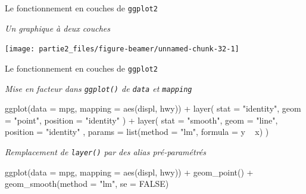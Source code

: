 \documentclass[12pt,ignorenonframetext,]{beamer}
\newenvironment{Shaded}{}{}
\newcommand{\KeywordTok}[1]{\textcolor[rgb]{0.00,0.00,1.00}{#1}}
\newcommand{\DataTypeTok}[1]{#1}
\newcommand{\StringTok}[1]{\textcolor[rgb]{0.00,0.50,0.50}{#1}}
\newcommand{\OtherTok}[1]{\textcolor[rgb]{1.00,0.25,0.00}{#1}}
\newcommand{\OperatorTok}[1]{#1}
\newcommand{\NormalTok}[1]{#1}
\renewenvironment{Shaded}{\begin{snugshade}}{\end{snugshade}}
\begin{document}
\begin{frame}{\large Le fonctionnement en \og couches \fg{} de
\texttt{ggplot2}}

\emph{Un graphique à deux couches}

\centering

\texttt{[image: partie2\_files/figure-beamer/unnamed-chunk-32-1]}

\end{frame}

\begin{frame}[fragile]{\large Le fonctionnement en \og couches \fg{} de
\texttt{ggplot2}}

\emph{Mise en facteur dans \texttt{ggplot()} de \texttt{data} et
\texttt{mapping}}

\footnotesize \vspace{-1mm}

\begin{Shaded}
\begin{Highlighting}[]
\KeywordTok{ggplot}\NormalTok{(}\DataTypeTok{data =}\NormalTok{ mpg, }\DataTypeTok{mapping =} \KeywordTok{aes}\NormalTok{(displ, hwy)) }\OperatorTok{+}\StringTok{ }\KeywordTok{layer}\NormalTok{(}
  \DataTypeTok{stat =} \StringTok{"identity"}\NormalTok{, }\DataTypeTok{geom =} \StringTok{"point"}\NormalTok{, }\DataTypeTok{position =} \StringTok{"identity"}
\NormalTok{) }\OperatorTok{+}\StringTok{ }\KeywordTok{layer}\NormalTok{(}
  \DataTypeTok{stat =} \StringTok{"smooth"}\NormalTok{, }\DataTypeTok{geom =} \StringTok{"line"}\NormalTok{, }\DataTypeTok{position =} \StringTok{"identity"}
\NormalTok{  , }\DataTypeTok{params =} \KeywordTok{list}\NormalTok{(}\DataTypeTok{method =} \StringTok{"lm"}\NormalTok{, }\DataTypeTok{formula =}\NormalTok{ y }\OperatorTok{~}\StringTok{ }\NormalTok{x)}
\NormalTok{)}
\end{Highlighting}
\end{Shaded}

\normalsize \vspace{-3mm}

\emph{Remplacement de \texttt{layer()} par des alias pré-paramétrés}

\footnotesize \vspace{-1mm}

\begin{Shaded}
\begin{Highlighting}[]
\KeywordTok{ggplot}\NormalTok{(}\DataTypeTok{data =}\NormalTok{ mpg, }\DataTypeTok{mapping =} \KeywordTok{aes}\NormalTok{(displ, hwy)) }\OperatorTok{+}\StringTok{ }
\StringTok{  }\KeywordTok{geom_point}\NormalTok{() }\OperatorTok{+}\StringTok{ }\KeywordTok{geom_smooth}\NormalTok{(}\DataTypeTok{method =} \StringTok{"lm"}\NormalTok{, }\DataTypeTok{se =} \OtherTok{FALSE}\NormalTok{)}
\end{Highlighting}
\end{Shaded}


\end{frame}
\end{document}

